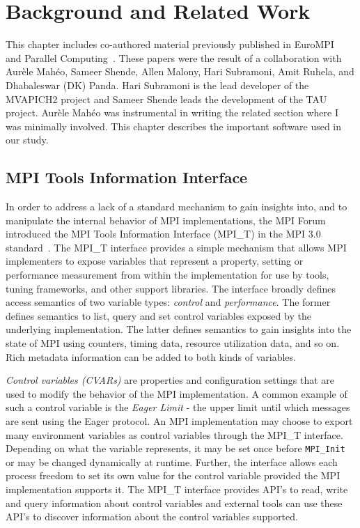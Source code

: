 \chapter{Background and Related Work}
This chapter includes co-authored material previously published in EuroMPI~\cite{EuroMPI} and Parallel Computing~\cite{ParCo}. These papers were the result of a collaboration with Aur\`{e}le Mah\'{e}o, Sameer Shende, Allen Malony, Hari Subramoni, Amit Ruhela, and Dhabaleswar (DK) Panda. Hari Subramoni is the lead developer of the MVAPICH2 project and Sameer Shende leads the development of the TAU project. Aur\`{e}le Mah\'{e}o was instrumental in writing the related section where I was minimally involved. This chapter describes the important software used in our study. 
\section{MPI Tools Information Interface}
In order to address a lack of a standard mechanism to gain insights into, and to manipulate the internal behavior of MPI implementations, the MPI Forum introduced the MPI Tools Information Interface (MPI\_T) in the MPI 3.0 standard~\cite{MPI_3_1}. The MPI\_T interface provides a simple mechanism that allows MPI implementers to expose variables that represent a property, setting or performance measurement from within the implementation for use by tools, tuning frameworks, and other support libraries. The interface broadly defines access semantics of two variable types: \textit{control} and \textit{performance}. The former defines semantics to list, query and set control variables exposed by the underlying implementation. The latter defines semantics to gain insights into the state of MPI using counters, timing data, resource utilization data, and so on. Rich metadata information can be added to both kinds of variables. \par
\textit{Control variables (CVARs)} are properties and configuration settings that are used to modify the behavior of the MPI implementation. A common example of such a control variable is the \emph{Eager Limit} - the upper limit until which messages are sent using the Eager protocol. An MPI implementation may choose to export many environment variables as control variables through the MPI\_T interface. Depending on what the variable represents, it may be set once before \verb+MPI_Init+ or may be changed dynamically at runtime. Further, the interface allows each process freedom to set its own value for the control variable provided the MPI implementation supports it. The MPI\_T interface provides API's to read, write and query information about control variables and external tools can use these API's to discover information about the control variables supported. \par
